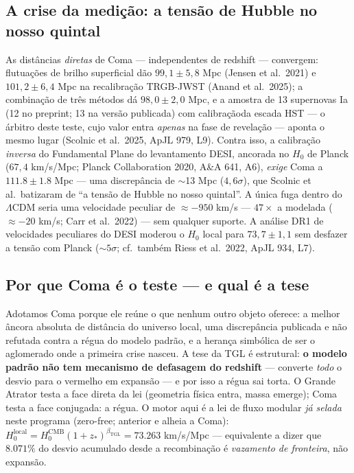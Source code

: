\documentclass[11pt]{article}
\newcommand{\bTGL}{\beta_{\mathrm{TGL}}}\newcommand{\Msun}{M_{\odot}}\newcommand{\TGL}{\mathrm{TGL}}
\theoremstyle{definition}\newtheorem{deriv}{Derivação}
\begin{document}
\subsection*{A crise da medição: a tensão de Hubble no nosso quintal}

As distâncias \emph{diretas} de Coma --- independentes de redshift --- convergem: flutuações de brilho superficial dão $99{,}1\pm5{,}8$ Mpc (Jensen et al.\ 2021) e $101{,}2\pm6{,}4$ Mpc na recalibração TRGB-JWST (Anand et al.\ 2025); a combinação de três métodos dá $98{,}0\pm2{,}0$ Mpc, e a amostra de 13 supernovas Ia (12 no preprint; 13 na versão publicada) com calibraçãoda escada HST --- o árbitro deste teste, cujo valor entra \emph{apenas} na fase de revelação --- aponta o mesmo lugar (Scolnic et al.\ 2025, ApJL 979, L9). Contra isso, a calibração \emph{inversa} do Fundamental Plane do levantamento DESI, ancorada no $H_0$ de Planck ($67{,}4$ km/s/Mpc; Planck Collaboration 2020, A\&A 641, A6), \emph{exige} Coma a $111.8\pm1.8$ Mpc --- uma discrepância de $\sim$13 Mpc ($4{,}6\sigma$), que Scolnic et al.\ batizaram de ``a tensão de Hubble no nosso quintal''. A única fuga dentro do $\Lambda$CDM seria uma velocidade peculiar de $\approx-950$ km/s --- $47\times$ a modelada ($\approx-20$ km/s; Carr et al.\ 2022) --- sem qualquer suporte. A análise DR1 de velocidades peculiares do DESI moderou o $H_0$ local para $73{,}7\pm1{,}1$ sem desfazer a tensão com Planck ($\sim5\sigma$; cf.\ também Riess et al.\ 2022, ApJL 934, L7).

\subsection*{Por que Coma é o teste --- e qual é a tese}

Adotamos Coma porque ele reúne o que nenhum outro objeto oferece: a melhor âncora absoluta de distância do universo local, uma discrepância publicada e não refutada contra a régua do modelo padrão, e a herança simbólica de ser o aglomerado onde a primeira crise nasceu. A tese da TGL é estrutural: \textbf{o modelo padrão não tem mecanismo de defasagem do redshift} --- converte \emph{todo} o desvio para o vermelho em expansão --- e por isso a régua sai torta. O Grande Atrator testa a face direta da lei (geometria física entra, massa emerge); Coma testa a face conjugada: a régua. O motor aqui é a lei de fluxo modular \emph{já selada} neste programa (zero-free; anterior e alheia a Coma): $H_0^{\mathrm{local}}=H_0^{\mathrm{CMB}}(1+z_*)^{\bTGL}=73.263$ km/s/Mpc --- equivalente a dizer que $8.071\%$ do desvio acumulado desde a recombinação é \emph{vazamento de fronteira}, não expansão.
\end{document}
